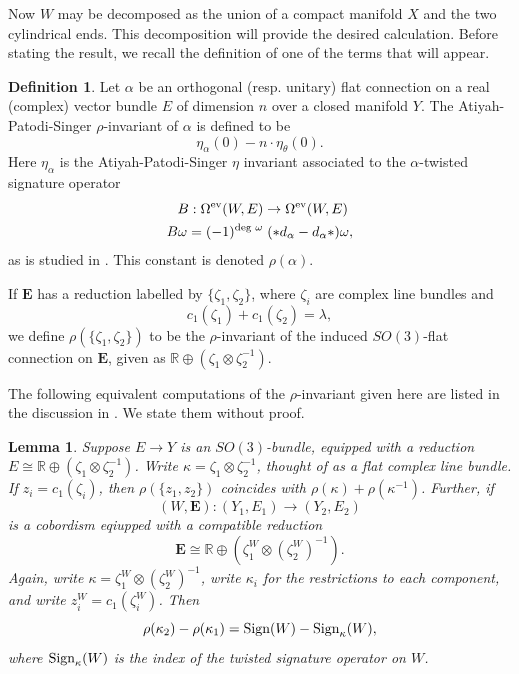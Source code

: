 \documentclass[10pt,a4paper]{amsart}
\newtheorem{lemma}[theorem]{Lemma}
\theoremstyle{definition}
\newtheorem{definition}[theorem]{Definition}
\theoremstyle{remark}
\numberwithin{figure}{qchap}
\begin{document}
Now $W$ may be decomposed as the union of a compact manifold $X$ and the two cylindrical ends. This decomposition will provide the desired calculation. Before stating the result, we recall the definition of one of the terms that will appear.

\begin{definition}Let $\alpha$ be an orthogonal (resp. unitary) flat connection on a real (complex) vector bundle $E$ of dimension $n$ over a closed manifold $Y$. The Atiyah-Patodi-Singer $\rho$-invariant of $\alpha$ is defined to be 
$$\eta_\alpha(0) - n \cdot \eta_\theta(0).$$ 
Here $\eta_\alpha$ is the Atiyah-Patodi-Singer $\eta$ invariant associated to the $\alpha$-twisted signature operator 
\begin{align*}
B: \Omega^{\textup{ev}}(W,E) &\to \Omega^{\textup{ev}}(W,E)\\
B\omega = (-1)^{\textup{deg } \omega}&\;(*d_\alpha - d_\alpha*)\omega,
\end{align*}
as is studied in \cite{atiyah1975spectral2}. This constant is denoted $\rho(\alpha)$.

If $\mathbf{E}$ has a reduction labelled by $\{\zeta_1, \zeta_2\}$, where $\zeta_i$ are complex line bundles and
$$c_1(\zeta_1) + c_1(\zeta_2) = \lambda,$$
we define $\rho(\{\zeta_1, \zeta_2\})$ to be the $\rho$-invariant of the induced $SO(3)$-flat connection on $\mathbf{E}$, given as $\mathbb R \oplus (\zeta_1 \otimes \zeta_2^{-1})$.
\end{definition}

The following equivalent computations of the $\rho$-invariant given here are listed in the discussion in \cite[Section~2.9]{hedden2011chern}. We state them without proof.

\begin{lemma}Suppose $E \to Y$ is an $SO(3)$-bundle, equipped with a reduction $E \cong \mathbb R \oplus (\zeta_1 \otimes \zeta_2^{-1})$. Write $\kappa = \zeta_1 \otimes \zeta_2^{-1}$, thought of as a flat complex line bundle.
If $z_i = c_1(\zeta_i)$, then $\rho(\{z_1, z_2\})$ coincides with $\rho(\kappa) + \rho(\kappa^{-1})$. Further, if 
$$(W,\mathbf{E}): (Y_1,E_1) \to (Y_2,E_2)$$ 
is a cobordism eqiupped with a compatible reduction  
$$\mathbf{E} \cong \mathbb R \oplus \left(\zeta_1^W \otimes (\zeta_2^{W})^{-1}\right).$$ 
Again, write $\kappa = \zeta_1^W \otimes (\zeta_2^W)^{-1}$, write $\kappa_i$ for the restrictions to each component, and write $z_i^W = c_1(\zeta_i^W)$. Then 
$$\rho(\kappa_2) - \rho(\kappa_1) = \textup{Sign}(W) - \textup{Sign}_\kappa(W),$$ 
where $\textup{Sign}_\kappa(W)$ is the index of the twisted signature operator on $W$.
\end{lemma}
\end{document}

